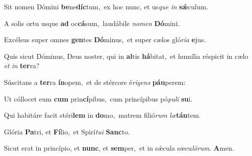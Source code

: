 \setcounter{versecount}{2}

\vs Sit nomen Dómini \textbf{be}ne\textbf{díc}tum,~\redgreheightstar ex hoc nunc, et us\textit{que} \textit{in} \textbf{sǽ}culum.

\vs A solis ortu usque \textbf{ad} oc\textbf{cá}sum,~\redgreheightstar laudábile \textit{no}\textit{men} \textbf{Dó}mini.

\vs Excélsus super omnes \textbf{gen}tes \textbf{Dó}minus,~\redgreheightstar et super cælos gló\textit{ri}\textit{a} \textbf{e}jus.

\vs Quis sicut Dóminus, Deus noster, qui in \textbf{al}tis \textbf{há}bitat,~\redgreheightstar et humília réspicit in cælo \textit{et} \textit{in} \textbf{ter}ra?

\vs Súscitans a \textbf{ter}ra \textbf{ín}opem,~\redgreheightstar et de stércore é\textit{ri}\textit{gens} \textbf{páu}perem:

\vs Ut cóllocet eum \textbf{cum} prin\textbf{cí}pibus,~\redgreheightstar cum princípibus pó\textit{pu}\textit{li} \textbf{su}i.

\vs Qui habitáre facit stéri\textbf{lem} in \textbf{do}mo,~\redgreheightstar matrem filió\textit{rum} \textit{læ}\textbf{tán}tem.

\vs Glória \textbf{Pa}tri, et \textbf{Fí}lio,~\redgreheightstar et Spirí\textit{tu}\textit{i} \textbf{Sanc}to.

\vs Sicut erat in princípio, et \textbf{nunc}, et \textbf{sem}per,~\redgreheightstar et in sǽcula sæcu\textit{ló}\textit{rum}. \textbf{A}men.

